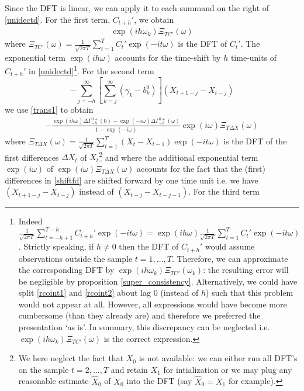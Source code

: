 \documentclass[11pt]{article}
\begin{document}
Since the DFT is linear, we can apply it to each summand on the right of  \ref{unidectd}.  For the first term, $C_{t+h}'$, we obtain
\begin{eqnarray*}
\exp(ih\omega_k)\Xi_{TC'}(\omega)
\end{eqnarray*}  
where $\Xi_{TC'}(\omega)=\frac{1}{\sqrt{2\pi T}}\sum_{t=1}^T C_t'\exp(-it\omega)$ is the DFT of $C_t'$. The exponential term $\exp(ih\omega)$ accounts for the time-shift by $h$ time-units of $C_{t+h}'$ in \ref{unidectd}\footnote{Indeed $\frac{1}{\sqrt{2\pi T}}\sum_{t=-h+1}^{T-h} C_{t+h}'\exp(-it\omega)=\exp(ih\omega)\frac{1}{\sqrt{2\pi T}}\sum_{t=1}^{T} C_{t}'\exp(-it\omega)$. Strictly speaking, if $h\not=0$ then the DFT of $C_{t+h}'$ would assume observations outside the sample $t=1,...,T$. Therefore, we can approximate the corresponding DFT by $\exp(ih\omega_k)\Xi_{TC'}(\omega_k)$: the resulting error will be negligible by proposition \ref{super_consistency}. Alternatively, we could have split \ref{rcoint1} and \ref{rcoint2} about lag 0 (instead of $h$) such that this problem would not appear at all. However, all expressions would have become more cumbersome (than they already are) and therefore we preferred the presentation `as is'. In summary, this discrepancy can be neglected i.e. $\exp(ih\omega_k)\Xi_{TC'}(\omega)$ is the correct expression.}. For the second term
\begin{equation}\label{shiftfd}
-\sum_{j=-h}^\infty
\left[\sum_{k=j}^\infty({\gamma}_{k}-b_k^0)\right]
(X_{t+1-j}-X_{t-j})
\end{equation}
 we use \ref{trans1} to obtain
\begin{eqnarray}\label{npes}
-\frac{\exp(ih\omega)\Delta\Gamma_{-h}^{0+}(0)-\exp(-i\omega)\Delta\Gamma_{-h}^{0+}(\omega)}{1-\exp(-i\omega)}\exp(i\omega)\Xi_{T\Delta X}(\omega)
\end{eqnarray}  
where $\Xi_{T\Delta X}(\omega)=\frac{1}{\sqrt{2\pi T}}\sum_{t=1}^T (X_t-X_{t-1})\exp(-it\omega)$ is the DFT of the first differences $\Delta X_t$ of $X_t$\footnote{\label{footdiff}We here neglect the fact that $X_0$ is not available: we can either run all DFT's on the sample $t=2,...,T$ and retain $X_1$ for intialization or we may plug any reasonable estimate $\hat{X}_0$ of $X_0$ into the DFT (say $\hat{X}_0=X_1$ for example).} and where the additional exponential term $\exp(i\omega)$ of $\exp(i\omega)\Xi_{T\Delta X}(\omega)$ accounts for the fact that the (first) differences  in \ref{shiftfd} are shifted forward by one time unit i.e. we have $(X_{t+1-j}-X_{t-j})$ instead of $(X_{t-j}-X_{t-j-1})$. For the third term
\end{document}
